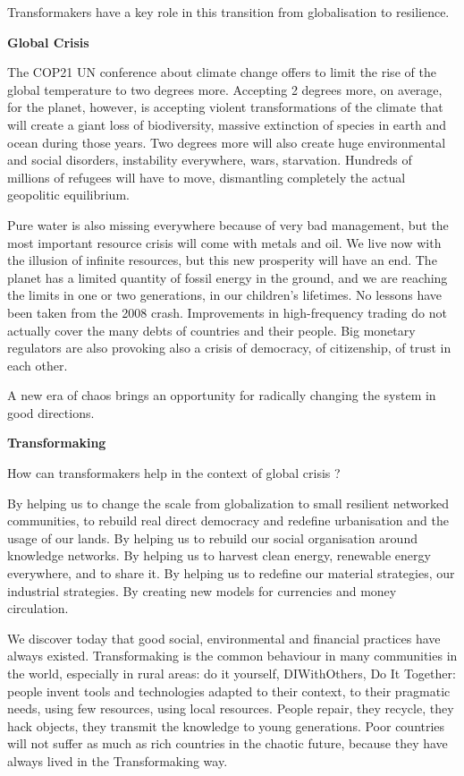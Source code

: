 Transformakers have a key role in this transition from globalisation to
resilience.

\textbf{Global Crisis}

The COP21 UN conference about climate change offers to limit the rise of
the global temperature to two degrees more. Accepting 2 degrees more, on
average, for the planet, however, is accepting violent transformations
of the climate that will create a giant loss of biodiversity, massive
extinction of species in earth and ocean during those years. Two degrees
more will also create huge environmental and social disorders,
instability everywhere, wars, starvation. Hundreds of millions of
refugees will have to move, dismantling completely the actual geopolitic
equilibrium.

Pure water is also missing everywhere because of very bad management,
but the most important resource crisis will come with metals and oil. We
live now with the illusion of infinite resources, but this new
prosperity will have an end. The planet has a limited quantity of fossil
energy in the ground, and we are reaching the limits in one or two
generations, in our children's lifetimes. No lessons have been taken
from the 2008 crash. Improvements in high-frequency trading do not
actually cover the many debts of countries and their people. Big
monetary regulators are also provoking also a crisis of democracy, of
citizenship, of trust in each other.

A new era of chaos brings an opportunity for radically changing the
system in good directions.

\textbf{Transformaking}

How can transformakers help in the context of global crisis ?

By helping us to change the scale from globalization to small resilient
networked communities, to rebuild real direct democracy and redefine
urbanisation and the usage of our lands. By helping us to rebuild our
social organisation around knowledge networks. By helping us to harvest
clean energy, renewable energy everywhere, and to share it. By helping
us to redefine our material strategies, our industrial strategies. By
creating new models for currencies and money circulation.

We discover today that good social, environmental and financial
practices have always existed. Transformaking is the common behaviour in
many communities in the world, especially in rural areas: do it
yourself, DIWithOthers, Do It Together: people invent tools and
technologies adapted to their context, to their pragmatic needs, using
few resources, using local resources. People repair, they recycle, they
hack objects, they transmit the knowledge to young generations. Poor
countries will not suffer as much as rich countries in the chaotic
future, because they have always lived in the Transformaking way.

